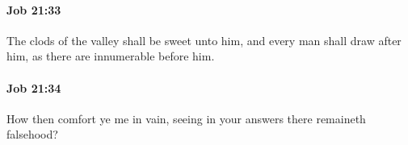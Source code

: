 		\paragraph{Job 21:33} %
			\label{JOB-21-33}

			The clods of the valley shall be sweet unto him, and every man shall draw after him, as there are innumerable before him.


		\paragraph{Job 21:34} %
			\label{JOB-21-34}

			How then comfort ye me in vain, seeing in your answers there remaineth falsehood?

